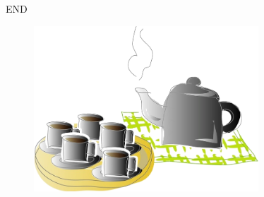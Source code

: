 \begin{frame}
\begin{center}
    \Huge END
\end{center}
\begin{figure}
    \includegraphics[width=0.75\textwidth]{figure/relax.png}
\end{figure}
\end{frame}